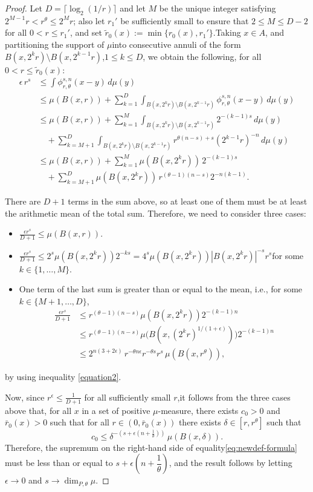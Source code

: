 \documentclass[12pt]{amsart}
\theoremstyle{definition}
\theoremstyle{remark}
\numberwithin{equation}{section}
\begin{document}
\begin{proof}
Let $D=\lceil\log_2 (1/r)\rceil$ and let $M$ be the unique integer satisfying $2^{M-1}r<r^\theta\leq 2^M r$; also let $r_1'$ be sufficiently small to ensure that $2\leq M\leq D-2$ for all $0<r\leq r_1'$, and set $\tilde r_0(x):=\min\{r_0(x),r_1'\}$.Taking $x\in A$, and partitioning the support of $\mu$into consecutive annuli of the form $B(x,2^k r)\setminus B(x,2^{k-1}r)$,$1\leq k\leq D$, we obtain the following, for all $0<r\leq \tilde r_0(x)$:\begin{align*}        \epsilon\, r^s&\leq \int \phi_{r,\theta}^{s,n}(x-y)\,d\mu(y)\\        &\leq \mu(B(x,r))+\sum_{k=1}^{D}\int_{ B(x,2^k r)\setminus B(x,2^{k-1}r) }\phi_{r,\theta}^{s,n}(x-y)\,d\mu(y) \\        &\leq \mu(B(x,r))+\sum_{k=1}^{M}\int_{ B(x,2^k r)\setminus B(x,2^{k-1}r) }2^{-(k-1)s}\,d\mu(y)\\        &\quad + \sum_{k=M+1}^{D}\int_{ B(x,2^k r)\setminus B(x,2^{k-1}r) }r^{\theta(n-s)+s}(2^{k-1}r)^{-n}\,d\mu(y)\\        &\leq \mu(B(x,r))+\sum_{k=1}^{M}\mu(B(x,2^k r))\,2^{-(k-1)s}\\        & \quad +\sum_{k=M+1}^{D} \mu(B(x,2^k r))\,r^{(\theta-1)(n-s)}2^{-n(k-1)}.    \end{align*}

There are $D+1$ terms in the sum above, so at least one of them must be at least the arithmetic mean of the total sum. Therefore, we need to consider three cases:\begin{itemize}    \item $\displaystyle \frac{\epsilon r^s}{D+1}\leq \mu(B(x,r)). $    \item $\displaystyle\frac{\epsilon r^s}{D+1} \leq 2^{s} \mu(B(x,2^{k}r))2^{-ks}=4^s \mu(B(x,2^{k}r)) |B(x,2^{k}r)|^{-s}r^s $for some $k\in\{1,\dots,M\}.$    \item One term of the last sum is greater than or equal to the mean,    i.e., for some $k\in \{M+1,\dots,D\}$,    \begin{align*}\frac{\epsilon r^s}{D+1}&\leq r^{(\theta-1)(n-s)}\mu(B(x,2^{k}r))2^{-(k-1)n}\\&\leq r^{(\theta-1)(n-s)}\mu\bigl(B(x,(2^{k}r)^{1/(1+\epsilon)})\bigr)2^{-(k-1)n}\\&\leq 2^{n(3+2\epsilon)}\, r^{-\theta n \epsilon} r^{-\theta s} r^{s}\,\mu(B(x,r^\theta)),\end{align*}\end{itemize}by using inequality \eqref{equation2}.

Now, since $r^\epsilon\leq \frac{1}{D+1}$ for all sufficiently small $r$,it follows from the three cases above that, for all $x$ in a set of positive $\mu$-measure, there exists $c_0>0$ and $\bar r_0(x)>0$ such that for all $r\in (0,\bar r_0(x))$ there exists $\delta\in [r,r^\theta]$ such that $$c_0 \leq \delta^{-\left(s+\epsilon\left(n+\frac{1}{\theta}\right)\right)}\,\mu(B(x,\delta)).$$Therefore, the supremum on the right-hand side of equality\eqref{eq:newdef-formula} must be less than or equal to $s+\epsilon\left(n+\dfrac{1}{\theta}\right)$, and the result follows by letting $\epsilon\to 0$ and $s\to \dim_{P,\theta}\mu$.
\end{proof}
\end{document}
